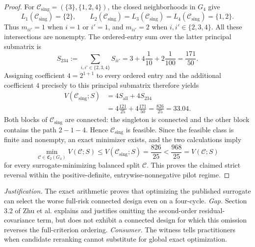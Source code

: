 \documentclass{article}
\begin{document}
\begin{proof}
For \(\mathcal C_{\mathrm{sing}}=(\{3\},\{1,2,4\})\), the closed neighborhoods in \(G_4\) give
\[
L_1(\mathcal C_{\mathrm{sing}})=\{2\},
\qquad
L_2(\mathcal C_{\mathrm{sing}})
=L_3(\mathcal C_{\mathrm{sing}})
=L_4(\mathcal C_{\mathrm{sing}})=\{1,2\}.
\]
Thus \(m_{ii'}=1\) when \(i=1\) or \(i'=1\), and \(m_{ii'}=2\) when \(i,i'\in\{2,3,4\}\).  All these intersections are nonempty.  The ordered-entry sum over the latter principal submatrix is
\[
S_{234}:=\sum_{i,i'\in\{2,3,4\}}S_{ii'}
=3+4\frac{1}{10}+2\frac{1}{100}
=\frac{171}{50}.
\]
Assigning coefficient \(4=2^{1+1}\) to every ordered entry and the additional coefficient \(4\) precisely to this principal submatrix therefore yields
\[
\begin{aligned}
V(\mathcal C_{\mathrm{sing}};S)
&=4S_{\mathrm{all}}+4S_{234}\\
&=4\frac{121}{25}+4\frac{171}{50}
=\frac{826}{25}=33.04.
\end{aligned}
\]
Both blocks of \(\mathcal C_{\mathrm{sing}}\) are connected: the singleton is connected and the other block contains the path \(2-1-4\).  Hence \(\mathcal C_{\mathrm{sing}}\) is feasible.  Since the feasible class is finite and nonempty, an exact minimizer exists, and the two calculations imply
\[
\min_{\mathcal C\in\mathfrak C_2(G_4)}V(\mathcal C;S)
\le V(\mathcal C_{\mathrm{sing}};S)
=\frac{826}{25}
<\frac{968}{25}
=V(\mathcal C;S)
\]
for every surrogate-minimizing balanced split \(\mathcal C\).  This proves the claimed strict reversal within the positive-definite, entrywise-nonnegative pilot regime.
\end{proof}
\par\smallskip\noindent \textit{Justification.} The exact arithmetic proves that optimizing the published surrogate can select the worse full-risk connected design even on a four-cycle. \textit{Gap.} Section 3.2 of Zhu et al. explains and justifies omitting the second-order residual-covariance term, but does not exhibit a connected design for which this omission reverses the full-criterion ordering. \textit{Consumer.} The witness tells practitioners when candidate reranking cannot substitute for global exact optimization.
\end{document}
